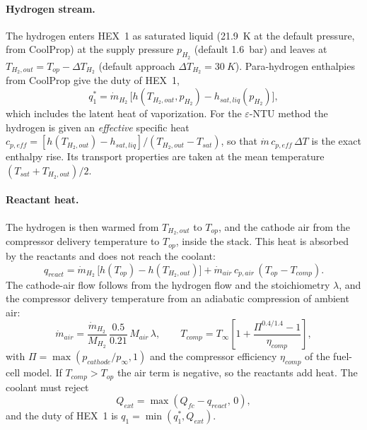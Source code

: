 \documentclass[a4paper,11pt]{article}
\newcommand{\Qfc}{Q_{fc}}
\newcommand{\Qext}{Q_{ext}}
\begin{document}
\paragraph{Hydrogen stream.} The hydrogen enters HEX~1 as saturated liquid (\SI{21.9}{K} at the
default pressure, from CoolProp) at the supply
pressure $p_{H_2}$ (default \SI{1.6}{bar}) and leaves at $T_{H_2,out} = T_{op} -
\Delta T_{H_2}$ (default approach $\Delta T_{H_2} = \SI{30}{K}$). Para-hydrogen
enthalpies from CoolProp give the duty of HEX~1,
\begin{equation}
  q_{1}^{*} = \dot m_{H_2}\,\big[h(T_{H_2,out}, p_{H_2}) - h_{sat,liq}(p_{H_2})\big],
  \label{eq:q1}
\end{equation}
which includes the latent heat of vaporization. For the $\varepsilon$-NTU method the
hydrogen is given an \emph{effective} specific heat
$c_{p,eff} = [h(T_{H_2,out}) - h_{sat,liq}]/(T_{H_2,out} - T_{sat})$, so that
$\dot m\,c_{p,eff}\,\Delta T$ is the exact enthalpy rise. Its transport properties are taken
at the mean temperature $(T_{sat} + T_{H_2,out})/2$.

\paragraph{Reactant heat.} The hydrogen is then warmed from $T_{H_2,out}$ to $T_{op}$, and
the cathode air from the compressor delivery temperature to $T_{op}$, inside the stack. This
heat is absorbed by the reactants and does not reach the coolant:
\begin{equation}
  q_{react} = \dot m_{H_2}\,\big[h(T_{op}) - h(T_{H_2,out})\big]
            + \dot m_{air}\,c_{p,air}\,(T_{op} - T_{comp}).
  \label{eq:qreact}
\end{equation}
The cathode-air flow follows from the hydrogen flow and the stoichiometry $\lambda$, and
the compressor delivery temperature from an adiabatic compression of ambient air:
\begin{equation}
  \dot m_{air} = \frac{\dot m_{H_2}}{M_{H_2}}\,\frac{0.5}{0.21}\,M_{air}\,\lambda,
  \qquad
  T_{comp} = T_\infty\left[1 + \frac{\Pi^{0.4/1.4} - 1}{\eta_{comp}}\right],
\end{equation}
with $\Pi = \max(p_{cathode}/p_\infty, 1)$ and the compressor efficiency $\eta_{comp}$ of the
fuel-cell model. If $T_{comp} > T_{op}$ the air term is negative, so the reactants add heat.
The coolant must reject
\begin{equation}
  \Qext = \max(\Qfc - q_{react},\,0),
\end{equation}
and the duty of HEX~1 is $q_1 = \min(q_1^{*}, \Qext)$.
\end{document}
